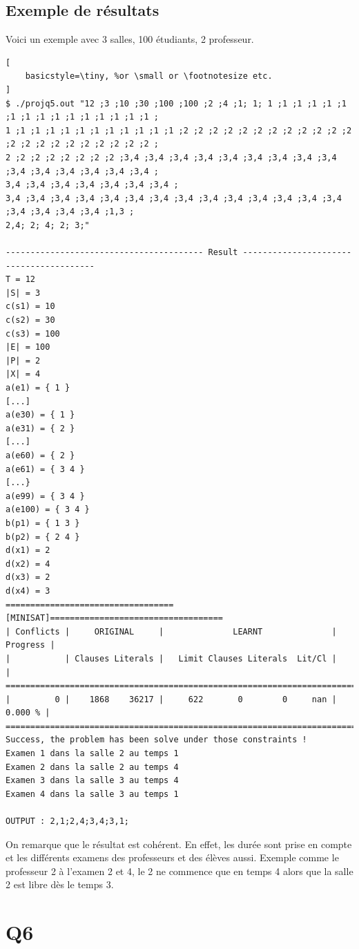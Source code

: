 \documentclass[a4paper,11pt]{article}
\begin{document}
\subsection{Exemple de résultats}
Voici un exemple avec 3 salles, 100 étudiants, 2 professeur.
\begin{lstlisting}[
    basicstyle=\tiny, %or \small or \footnotesize etc.
]
$ ./projq5.out "12 ;3 ;10 ;30 ;100 ;100 ;2 ;4 ;1; 1; 1 ;1 ;1 ;1 ;1 ;1 ;1 ;1 ;1 ;1 ;1 ;1 ;1 ;1 ;1 ;1 ;
1 ;1 ;1 ;1 ;1 ;1 ;1 ;1 ;1 ;1 ;1 ;1 ;2 ;2 ;2 ;2 ;2 ;2 ;2 ;2 ;2 ;2 ;2 ;2 ;2 ;2 ;2 ;2 ;2 ;2 ;2 ;2 ;2 ;2 ;
2 ;2 ;2 ;2 ;2 ;2 ;2 ;2 ;3,4 ;3,4 ;3,4 ;3,4 ;3,4 ;3,4 ;3,4 ;3,4 ;3,4 ;3,4 ;3,4 ;3,4 ;3,4 ;3,4 ;3,4 ;
3,4 ;3,4 ;3,4 ;3,4 ;3,4 ;3,4 ;3,4 ;
3,4 ;3,4 ;3,4 ;3,4 ;3,4 ;3,4 ;3,4 ;3,4 ;3,4 ;3,4 ;3,4 ;3,4 ;3,4 ;3,4 ;3,4 ;3,4 ;3,4 ;3,4 ;1,3 ;
2,4; 2; 4; 2; 3;"

---------------------------------------- Result ----------------------------------------
T = 12
|S| = 3
c(s1) = 10
c(s2) = 30
c(s3) = 100
|E| = 100
|P| = 2
|X| = 4
a(e1) = { 1 }
[...]
a(e30) = { 1 }
a(e31) = { 2 }
[...]
a(e60) = { 2 }
a(e61) = { 3 4 }
[...}
a(e99) = { 3 4 }
a(e100) = { 3 4 }
b(p1) = { 1 3 }
b(p2) = { 2 4 }
d(x1) = 2
d(x2) = 4
d(x3) = 2
d(x4) = 3
==================================[MINISAT]===================================
| Conflicts |     ORIGINAL     |              LEARNT              | Progress |
|           | Clauses Literals |   Limit Clauses Literals  Lit/Cl |          |
==============================================================================
|         0 |    1868    36217 |     622       0        0     nan |  0.000 % |
==============================================================================
Success, the problem has been solve under those constraints !
Examen 1 dans la salle 2 au temps 1
Examen 2 dans la salle 2 au temps 4
Examen 3 dans la salle 3 au temps 4
Examen 4 dans la salle 3 au temps 1

OUTPUT : 2,1;2,4;3,4;3,1;

\end{lstlisting}
On remarque que le résultat est cohérent. En effet, les durée sont prise en compte et les différents examens des professeurs et des élèves aussi. Exemple comme le professeur 2 à l'examen 2 et 4, le 2 ne commence que en temps 4 alors que la salle 2 est libre dès le temps 3.

\section{Q6}
\end{document}
